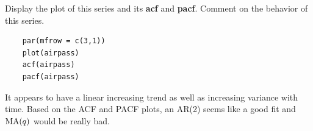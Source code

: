 Display the plot of this series and its \textbf{acf} and \textbf{pacf}. Comment on the behavior of this series.
\begin{verbatim}
    par(mfrow = c(3,1))
    plot(airpass)
    acf(airpass)
    pacf(airpass)
\end{verbatim}

\nl It appears to have a linear increasing trend as well as increasing variance with time. Based on the ACF and PACF plots, an AR(2) seems like a good fit and $\operatorname{MA}(q)$ would be really bad.